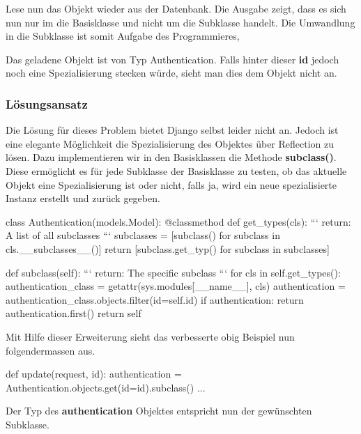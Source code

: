 Lese nun das Objekt wieder aus der Datenbank. Die Ausgabe zeigt, dass es sich nun nur im die Basisklasse und nicht um die Subklasse handelt. Die Umwandlung in die Subklasse ist somit Aufgabe des Programmieres,

\medskip
Das geladene Objekt ist von Typ Authentication. Falls hinter dieser \textbf{id} jedoch noch eine Spezialisierung stecken würde, sieht man dies dem Objekt nicht an.
\subsubsection{Lösungsansatz}
Die Lösung für dieses Problem bietet Django selbst leider nicht an. Jedoch ist eine elegante Möglichkeit die Spezialisierung des Objektes über Reflection zu lösen. Dazu implementieren wir in den Basisklassen die Methode \textbf{subclass()}.\\
Diese ermöglicht es für jede Subklasse der Basisklasse zu testen, ob das aktuelle Objekt eine Spezialisierung ist oder nicht, falls ja, wird ein neue spezialisierte Instanz erstellt und zurück gegeben.
\medskip
\begin{python}
class Authentication(models.Model):
    @classmethod
    def get_types(cls):
        ```
        return: A list of all subclasses
        ```
        subclasses = [subclass() for subclass in cls.__subclasses__()]
        return [subclass.get_typ() for subclass in subclasses]	
	
    def subclass(self):
        ```
        return: The specific subclass 
        ```
        for cls in self.get_types():
            authentication_class = getattr(sys.modules[__name__], cls)
            authentication = authentication_class.objects.filter(id=self.id)
            if authentication:
                return authentication.first()
        return self
\end{python}
\medskip
Mit Hilfe dieser Erweiterung sieht das verbesserte obig Beispiel nun folgendermassen aus.
\medskip
\begin{python}
def update(request, id):
    authentication = Authentication.objects.get(id=id).subclass()
    ...
\end{python}
\medskip
Der Typ des \textbf{authentication} Objektes entspricht nun der gewünschten Subklasse.\\\\


